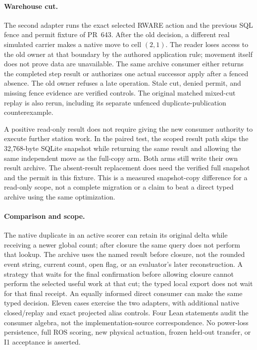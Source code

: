 \documentclass[11pt]{article}
\begin{document}
\paragraph{Warehouse cut.}
The second adapter runs the exact selected RWARE action and
the previous SQL fence and permit fixture of PR~643.
After the old decision, a different real simulated carrier
makes a native move to cell \((2,1)\).
The reader loses access to the old owner at that boundary
by the authored application rule; movement itself does not
prove data are unavailable. The same archive consumer either
returns the completed step result or authorizes one actual
successor apply after a fenced absence. The old owner refuses
a late operation. Stale cut, denied permit, and missing
fence evidence are verified controls. The original matched
mixed-cut replay is also rerun, including its separate
unfenced duplicate-publication counterexample.

A positive read-only result does not require giving the
new consumer authority to execute further station work.
In the paired test, the scoped result path skips the
32,768-byte SQLite snapshot while returning the same
result and allowing the same independent move as the
full-copy arm. Both arms still write their own result
archive. The absent-result replacement does need the
verified full snapshot and the permit in this fixture.
This is a measured snapshot-copy difference for a
read-only scope, not a complete migration or a claim
to beat a direct typed archive using the same optimization.

\paragraph{Comparison and scope.}
The native duplicate in an active scorer can retain its
original delta while receiving a newer global count;
after closure the same query does not perform that lookup.
The archive uses the named result before closure, not
the rounded event string, current count, open flag, or
an evaluator's later reconstruction. A strategy that waits
for the final confirmation before allowing closure cannot
perform the selected useful work at that cut; the typed
local export does not wait for that final receipt.
An equally informed direct consumer can make the same
typed decision. Eleven cases exercise the two adapters,
with additional native closed/replay and exact projected
alias controls. Four Lean statements audit the consumer
algebra, not the implementation-source correspondence.
No power-loss persistence, full ROS scoring, new
physical actuation, frozen held-out transfer, or I1
acceptance is asserted.
\end{document}
